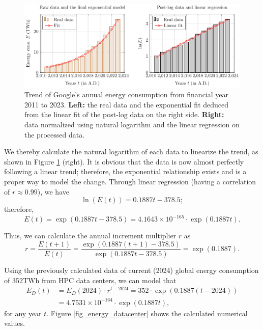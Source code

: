 \documentclass[12pt]{article}
\begin{document}
\begin{figure}[!t]
	\centering
	\includegraphics{figures/trends/google.pdf}
	\caption{Trend of Google's annual energy consumption from financial year 2011 to 2023. \textbf{Left:} the real data and the exponential fit deduced from the linear fit of the post-log data on the right side. \textbf{Right:} data normalized using natural logarithm and the linear regression on the processed data.}
	\label{fig_google}
\end{figure}

We thereby calculate the natural logarithm of each data to linearize the trend, as shown in Figure \ref{fig_google} (right). It is obvious that the data is now almost perfectly following a linear trend; therefore, the exponential relationship exists and is a proper way to model the change. Through linear regression (having a correlation of $r \approx 0.99$), we have
\begin{equation}
	\ln \left(E(t)\right) = 0.1887t - 378.5;
\end{equation}
therefore,
\begin{equation}
	E(t) = \exp \left(0.1887t - 378.5\right) = 4.1643 \times 10^{-165} \cdot \exp \left(0.1887t\right).
\end{equation}

Thus, we can calculate the annual increment multiplier $r$ as
\begin{equation}
	r = \frac{E\left(t + 1\right)}{E(t)}
	= \frac{\exp \left(0.1887\left(t + 1\right) - 378.5\right)}{\exp \left(0.1887t - 378.5\right)}
	= \exp \left(0.1887\right).
\end{equation}

Using the previously calculated data of current (2024) global energy consumption of 352TWh from HPC data centers, we can model that
\begin{equation}
	\begin{aligned}
		E_D(t) &= E_D(2024) \cdot r^{t - 2024} = 352 \cdot \exp \left(0.1887(t - 2024)\right) \\
		&= 4.7531 \times 10^{-164} \cdot \exp \left(0.1887t\right),
	\end{aligned}
\end{equation}
for any year $t$. Figure \ref{fig_energy_datacenter} shows the calculated numerical values.
\end{document}
